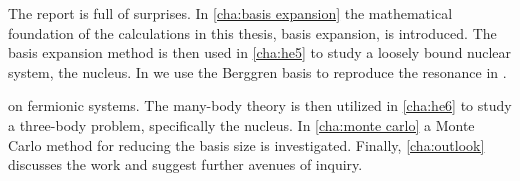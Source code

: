 \documentclass[../main/report.tex]{subfiles}
\begin{document}
The report is full of surprises. In \cref{cha:basis expansion} the mathematical foundation of the calculations in this thesis, basis expansion, is introduced.
The basis expansion method is then used in \cref{cha:he5} to study a loosely bound nuclear system, the  nucleus.
In  we use the Berggren basis to reproduce the resonance in .


on fermionic systems. 
The many-body theory is then utilized in \cref{cha:he6} 
to study a three-body problem, specifically the  nucleus.  
In \cref{cha:monte carlo} a Monte Carlo method for reducing the basis size is investigated. 
Finally, \cref{cha:outlook} discusses the work and suggest further avenues of inquiry.
\end{document}
